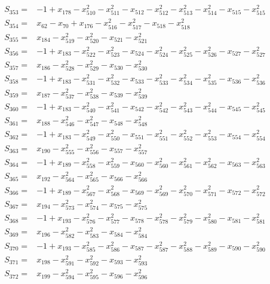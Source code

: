 \begin{align*}
S_{353}={}&-1+x_{178}-x_{510}^{2}-x_{511}^{2}-x_{512}-x_{512}^{2}-x_{513}^{2}-x_{514}^{2}-x_{515}-x_{515}^{2}\\[3pt]
S_{354}={}&x_{62}-x_{70}+x_{176}-x_{516}^{2}-x_{517}^{2}-x_{518}-x_{518}^{2}\\[3pt]
S_{355}={}&x_{184}-x_{519}^{2}-x_{520}^{2}-x_{521}-x_{521}^{2}\\[3pt]
S_{356}={}&-1+x_{183}-x_{522}^{2}-x_{523}^{2}-x_{524}-x_{524}^{2}-x_{525}^{2}-x_{526}^{2}-x_{527}-x_{527}^{2}\\[3pt]
S_{357}={}&x_{186}-x_{528}^{2}-x_{529}^{2}-x_{530}-x_{530}^{2}\\[3pt]
S_{358}={}&-1+x_{183}-x_{531}^{2}-x_{532}^{2}-x_{533}-x_{533}^{2}-x_{534}^{2}-x_{535}^{2}-x_{536}-x_{536}^{2}\\[3pt]
S_{359}={}&x_{187}-x_{537}^{2}-x_{538}^{2}-x_{539}-x_{539}^{2}\\[3pt]
S_{360}={}&-1+x_{183}-x_{540}^{2}-x_{541}^{2}-x_{542}-x_{542}^{2}-x_{543}^{2}-x_{544}^{2}-x_{545}-x_{545}^{2}\\[3pt]
S_{361}={}&x_{188}-x_{546}^{2}-x_{547}^{2}-x_{548}-x_{548}^{2}\\[3pt]
S_{362}={}&-1+x_{183}-x_{549}^{2}-x_{550}^{2}-x_{551}-x_{551}^{2}-x_{552}^{2}-x_{553}^{2}-x_{554}-x_{554}^{2}\\[3pt]
S_{363}={}&x_{190}-x_{555}^{2}-x_{556}^{2}-x_{557}-x_{557}^{2}\\[3pt]
S_{364}={}&-1+x_{189}-x_{558}^{2}-x_{559}^{2}-x_{560}-x_{560}^{2}-x_{561}^{2}-x_{562}^{2}-x_{563}-x_{563}^{2}\\[3pt]
S_{365}={}&x_{192}-x_{564}^{2}-x_{565}^{2}-x_{566}-x_{566}^{2}\\[3pt]
S_{366}={}&-1+x_{189}-x_{567}^{2}-x_{568}^{2}-x_{569}-x_{569}^{2}-x_{570}^{2}-x_{571}^{2}-x_{572}-x_{572}^{2}\\[3pt]
S_{367}={}&x_{194}-x_{573}^{2}-x_{574}^{2}-x_{575}-x_{575}^{2}\\[3pt]
S_{368}={}&-1+x_{193}-x_{576}^{2}-x_{577}^{2}-x_{578}-x_{578}^{2}-x_{579}^{2}-x_{580}^{2}-x_{581}-x_{581}^{2}\\[3pt]
S_{369}={}&x_{196}-x_{582}^{2}-x_{583}^{2}-x_{584}-x_{584}^{2}\\[3pt]
S_{370}={}&-1+x_{193}-x_{585}^{2}-x_{586}^{2}-x_{587}-x_{587}^{2}-x_{588}^{2}-x_{589}^{2}-x_{590}-x_{590}^{2}\\[3pt]
S_{371}={}&x_{198}-x_{591}^{2}-x_{592}^{2}-x_{593}-x_{593}^{2}\\[3pt]
S_{372}={}&x_{199}-x_{594}^{2}-x_{595}^{2}-x_{596}-x_{596}^{2}\\[3pt]

\end{align*}
